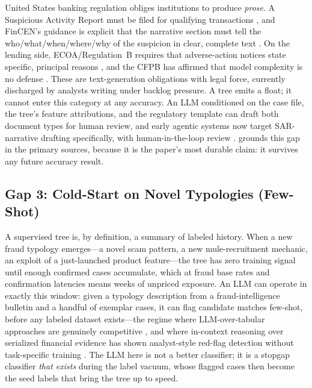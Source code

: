 United States banking regulation obliges institutions to produce
\emph{prose}. A Suspicious Activity Report must be filed for qualifying
transactions \citep{cfr1020_320}, and FinCEN's guidance is explicit that the
narrative section must tell the who/what/when/where/why of the suspicion in
clear, complete text \citep{fincen2003sarnarrative}. On the lending side,
ECOA/Regulation~B requires that adverse-action notices state specific,
principal reasons \citep{cfr1002_9}, and the CFPB has affirmed that model
complexity is no defense \citep{cfpb2022circular}. These are text-generation
obligations with legal force, currently discharged by analysts writing under
backlog pressure. A tree emits a float; it cannot enter this category at any
accuracy. An LLM conditioned on the case file, the tree's feature attributions,
and the regulatory template can draft both document types for human review,
and early agentic systems now target SAR-narrative drafting specifically, with
human-in-the-loop review \citep{naik2025coinvestigator}.
 grounds this gap in the primary sources, because it
is the paper's most durable claim: it survives any future accuracy result.

\subsection{Gap 3: Cold-Start on Novel Typologies (Few-Shot)}
\label{sec:p8-gap-coldstart}

A supervised tree is, by definition, a summary of labeled history. When a new
fraud typology emerges---a novel scam pattern, a new mule-recruitment
mechanic, an exploit of a just-launched product feature---the tree has zero
training signal until enough confirmed cases accumulate, which at fraud base
rates and confirmation latencies \citep{dalpozzolo2018realistic} means weeks
of unpriced exposure. An LLM can operate in exactly this window: given a
typology description from a fraud-intelligence bulletin and a handful of
exemplar cases, it can flag candidate matches few-shot, before any labeled
dataset exists---the regime where LLM-over-tabular approaches are genuinely
competitive \citep{hegselmann2023tabllm}, and where in-context reasoning over
serialized financial evidence has shown analyst-style red-flag detection
without task-specific training \citep{pirmorad2025icl_aml}. The LLM here is
not a better classifier; it is a stopgap classifier \emph{that exists} during
the label vacuum, whose flagged cases then become the seed labels that bring
the tree up to speed.

